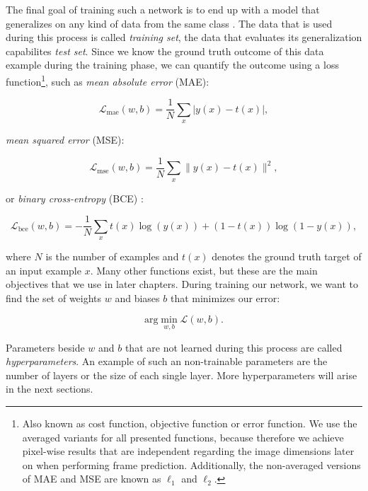 The final goal of training such a network is to end up with a model that generalizes on any kind of data from the same class \parencite[p. 2]{pattern_and_ml}. The data that is used during this process is called \textit{training set}, the data that evaluates its generalization capabilites \textit{test set}. Since we know the ground truth outcome of this data example during the training phase, we can quantify the outcome using a loss function\footnote{Also known as cost function, objective function or error function. We use the averaged variants for all presented functions, because therefore we achieve pixel-wise results that are independent regarding the image dimensions later on when performing frame prediction. Additionally, the non-averaged versions of MAE and MSE are known as $ \ell_{1} $ and $ \ell_{2} $.}, such as \textit{mean absolute error} (MAE):


\begin{equation} \label{eq:mae}
  \mathcal{L}_{\textrm{mae}}(w, b)=\frac{1}{N} \sum\limits_{x} | y(x) - t(x) | ,
\end{equation}

\textit{mean squared error} (MSE):

\begin{equation} \label{eq:mse}
  \mathcal{L}_{\textrm{mse}}(w, b)=\frac{1}{N} \sum\limits_{x} \| y(x) - t(x) \|^2 ,
\end{equation}

or \textit{binary cross-entropy} (BCE) \parencite{conv_lstm_nowcasting}:

\begin{equation} \label{eq:bce}
  \mathcal{L}_{\textrm{bce}}(w, b)= -\frac{1}{N} \sum\limits_{x} t(x) \log{(y(x))} + (1-t(x)) \log{(1-y(x))} ,
\end{equation}

where $ N $ is the number of examples and $ t(x) $ denotes the ground truth target of an input example $x$. Many other functions exist, but these are the main objectives that we use in later chapters. During training our network, we want to find the set of weights $ w $ and biases $ b $ that minimizes our error:

\begin{equation} \label{eq:min-loss}
  \textrm{arg}\min_{w, b} \mathcal{L}(w, b) .
\end{equation}

Parameters beside $ w $ and $ b $ that are not learned during this process are called \textit{hyperparameters}. An example of such an non-trainable parameters are the number of layers or the size of each single layer. More hyperparameters will arise in the next sections.


